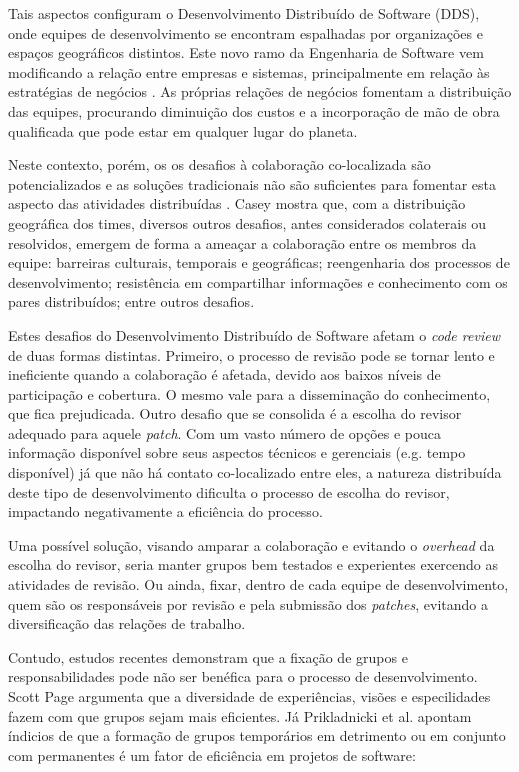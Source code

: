 \documentclass[preprint,review, 12pt]{elsarticle}
\begin{document}
  Tais aspectos configuram o Desenvolvimento Distribuído de Software (DDS), onde equipes de desenvolvimento se encontram espalhadas por organizações e espaços geográficos distintos. Este novo ramo da Engenharia de Software vem modificando a relação entre empresas e sistemas, principalmente em relação às estratégias de negócios \cite{audy2007}. As próprias relações de negócios fomentam a distribuição das equipes, procurando diminuição dos custos e a incorporação de mão de obra qualificada que pode estar em qualquer lugar do planeta.

  Neste contexto, porém, os os desafios à colaboração co-localizada são potencializados e as soluções tradicionais não são suficientes para fomentar esta aspecto das atividades distribuídas \cite{nicolaci2011}. Casey \cite{casey2010} mostra que, com a distribuição geográfica dos times, diversos outros desafios, antes considerados colaterais ou resolvidos, emergem de forma a ameaçar a colaboração entre os membros da equipe: barreiras culturais, temporais e geográficas; reengenharia dos processos de desenvolvimento; resistência em compartilhar informações e conhecimento com os pares distribuídos; entre outros desafios.

  Estes desafios do Desenvolvimento Distribuído de Software afetam o \textit{code review} de duas formas distintas. Primeiro, o processo de revisão pode se tornar lento e ineficiente quando a colaboração é afetada, devido aos baixos níveis de participação e cobertura. O mesmo vale para a disseminação do conhecimento, que fica prejudicada. Outro desafio que se consolida é a escolha do revisor adequado para aquele \textit{patch}. Com um vasto número de opções e pouca informação disponível sobre seus aspectos técnicos e gerenciais (e.g. tempo disponível) já que não há contato co-localizado entre eles, a natureza distribuída deste tipo de desenvolvimento dificulta o processo de escolha do revisor, impactando negativamente a eficiência do processo.

  Uma possível solução, visando amparar a colaboração e evitando o \textit{overhead} da escolha do revisor, seria manter grupos bem testados e experientes exercendo as atividades de revisão. Ou ainda, fixar, dentro de cada equipe de desenvolvimento, quem são os responsáveis por revisão e pela submissão dos \textit{patches}, evitando a diversificação das relações de trabalho.

  Contudo, estudos recentes demonstram que a fixação de grupos e responsabilidades pode não ser benéfica para o processo de desenvolvimento. Scott Page \cite{page2008} argumenta que a diversidade de experiências, visões e especilidades fazem com que grupos sejam mais eficientes. Já Prikladnicki et al. \cite{prikladnicki2017} apontam índicios de que a formação de grupos temporários em detrimento ou em conjunto com permanentes é um fator de eficiência em projetos de software:
\end{document}
